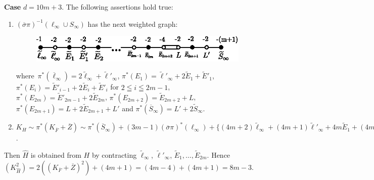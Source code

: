 \subsubsection{}\label{chap3:3.6.3}
{\bf Case} $d=10m+3$. The following assertions hold true:
\begin{enumerate}
\renewcommand{\labelenumi}{(\theenumi)}
\item $(\overline{\sigma}\pi)^{-1}(\ell_{\infty}\cup S_{\infty})$ has
  the next weighted graph:
\begin{figure}[H]
\centering
\includegraphics[scale=1.1]{figures/miyansi_fig46.eps}
\end{figure}

\noindent
where\pageoriginale\
$\pi^{\ast} (\overline{\ell}_{\infty})=2\widetilde{\ell}_{\infty}+\widetilde{\ell}'_{\infty}$,
$\pi^{\ast}(E_{1})=\widetilde{\ell}'_{\infty}+2\widetilde{E}_{1}+\widetilde{E}'_{1}$,
$\pi^{\ast}(E_{i})=\widetilde{E}'_{i-1}+2\widetilde{E}_{i}+\widetilde{E}'_{i}$
for $2\leqq i\leqq 2m-1$,
$\pi^{\ast}(E_{2m})=\widetilde{E}'_{2m-1}+2\widetilde{E}_{2m}$,
$\pi^{\ast}(E_{2m+2})=\widetilde{E}_{2m+2}+L$,
$\pi^{\ast}(E_{2m+1})=L+2\widetilde{E}_{2m+1}+L'$ and
$\pi^{\ast}(\overline{S}_{\infty})=L'+2\widetilde{S}_{\infty}$.

\item $K_{H}\sim \pi^{\ast}(K_{\overline{F}}+\overline{Z})\sim
  \pi^{\ast}(\overline{S}_{\infty})+(3m-1)(\overline{\sigma}\pi)^{\ast}(\ell_{\infty})+\{(4m+2)\widetilde{\ell}_{\infty}+(4m+1)\widetilde{\ell}'_{\infty}+4m\widetilde{E}_{1}+(4m-1)\widetilde{E}'_{1}+\cdots+3\widetilde{E}'_{2m-1}+2\widetilde{E}_{2m}\}+\widetilde{E}_{2m+2}+2L+2\widetilde{E}_{2m+1}+L'$. 
\end{enumerate}

Then $\widehat{H}$ is obtained from $H$ by contracting
$\widetilde{\ell}_{\infty}$, $\widetilde{\ell}'_{\infty}$,
$\widetilde{E}_{1},\ldots,\widetilde{E}_{2m}$. Hence
$(K^{2}_{\widehat{H}})=2((K_{\overline{F}}+\overline{Z})^{2})+(4m+1)=(4m-4)+(4m+1)=8m-3$.  

